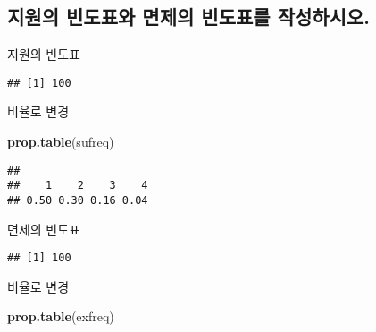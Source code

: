 \documentclass[
]{article}
\newenvironment{Shaded}{\begin{snugshade}}{\end{snugshade}}
\newcommand{\KeywordTok}[1]{\textcolor[rgb]{0.13,0.29,0.53}{\textbf{#1}}}
\newcommand{\NormalTok}[1]{#1}
\newcommand{\OperatorTok}[1]{\textcolor[rgb]{0.81,0.36,0.00}{\textbf{#1}}}
\newcommand{\StringTok}[1]{\textcolor[rgb]{0.31,0.60,0.02}{#1}}
\begin{document}
\hypertarget{uxc9c0uxc6d0uxc758-uxbe48uxb3c4uxd45cuxc640-uxba74uxc81cuxc758-uxbe48uxb3c4uxd45cuxb97c-uxc791uxc131uxd558uxc2dcuxc624.}{%
\subsection{지원의 빈도표와 면제의 빈도표를
작성하시오.}\label{uxc9c0uxc6d0uxc758-uxbe48uxb3c4uxd45cuxc640-uxba74uxc81cuxc758-uxbe48uxb3c4uxd45cuxb97c-uxc791uxc131uxd558uxc2dcuxc624.}}

지원의 빈도표

\begin{Shaded}
\end{Shaded}

\begin{verbatim}
## [1] 100
\end{verbatim}

비율로 변경

\begin{Shaded}
\begin{Highlighting}[]
\KeywordTok{prop.table}\NormalTok{(sufreq)}
\end{Highlighting}
\end{Shaded}

\begin{verbatim}
## 
##    1    2    3    4 
## 0.50 0.30 0.16 0.04
\end{verbatim}

면제의 빈도표

\begin{Shaded}
\end{Shaded}

\begin{verbatim}
## [1] 100
\end{verbatim}

비율로 변경

\begin{Shaded}
\begin{Highlighting}[]
\KeywordTok{prop.table}\NormalTok{(exfreq)}
\end{Highlighting}
\end{Shaded}
\end{document}
